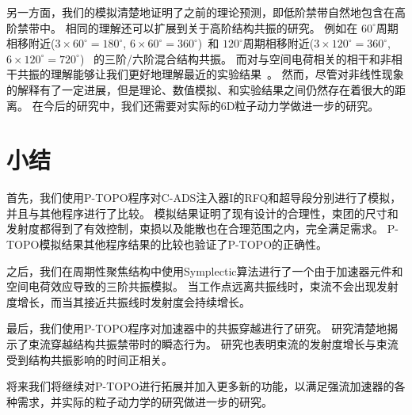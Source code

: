 另一方面，我们的模拟清楚地证明了之前的理论预测，即低阶禁带自然地包含在高阶禁带中。
相同的理解还可以扩展到关于高阶结构共振的研究。
例如在 $60^{\circ}$周期相移附近($3 \times 60^{\circ} = 180^{\circ}$, $6 \times 60^{\circ} = 360^{\circ}$)~\cite{li2015space}和 $120^{\circ}$周期相移附近($3 \times 120^{\circ} = 360^{\circ}$, $6 \times 120^{\circ} = 720^{\circ}$)~\cite{11,36}
的三阶/六阶混合结构共振。
而对与空间电荷相关的相干和非相干共振的理解能够让我们更好地理解最近的实验结果~\cite{31,32,33}。
然而，尽管对非线性现象的解释有了一定进展，但是理论、数值模拟、和实验结果之间仍然存在着很大的距离。
在今后的研究中，我们还需要对实际的6D粒子动力学做进一步的研究。

\section{小结}                    \label{section:Simulation_conclusion}
首先，我们使用P-TOPO程序对C-ADS注入器I的RFQ和超导段分别进行了模拟，并且与其他程序进行了比较。
模拟结果证明了现有设计的合理性，束团的尺寸和发射度都得到了有效控制，束损以及能散也在合理范围之内，完全满足需求。
P-TOPO模拟结果其他程序结果的比较也验证了P-TOPO的正确性。

之后，我们在周期性聚焦结构中使用Symplectic算法进行了一个由于加速器元件和空间电荷效应导致的三阶共振模拟。
当工作点远离共振线时，束流不会出现发射度增长，而当其接近共振线时发射度会持续增长。

最后，我们使用P-TOPO程序对加速器中的共振穿越进行了研究。
研究清楚地揭示了束流穿越结构共振禁带时的瞬态行为。
研究也表明束流的发射度增长与束流受到结构共振影响的时间正相关。

将来我们将继续对P-TOPO进行拓展并加入更多新的功能，以满足强流加速器的各种需求，并实际的粒子动力学的研究做进一步的研究。